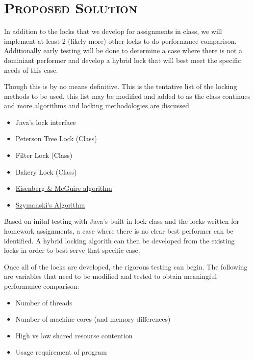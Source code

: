 \documentclass[finalProject.tex]{subfiles}
\begin{document}
\bigskip

\section*{\textsc{\Large Proposed Solution}}

In addition to the locks that we develop for assignments in class, we will implement at least 2 (likely more) other locks to do performance comparison. Additionally early testing will be done to determine a case where there is not a dominiant performer and develop a hybrid lock that will best meet the specific needs of this case.

Though this is by no means definitive. This is the tentative list of the locking methods to be used, this list may be modified and added to as the class continues and more algorithms and locking methodologies are discussed 

\smallskip

\begin{itemize}
\item Java's lock interface
\item Peterson Tree Lock (Class)
\item Filter Lock (Class)
\item Bakery Lock (Class)
\item \href{http://en.wikipedia.org/wiki/Eisenberg_%26_McGuire_algorithm}{Eisenberg \& McGuire algorithm}
\item \href{http://en.wikipedia.org/wiki/Szymanski%27s_Algorithm}{Szymanski's Algorithm}
\end{itemize}

Based on inital testing with Java's built in lock class and the locks written for homework assignments, a case where there is no clear best performer can be identified. A hybrid locking algorith can then be developed from the existing locks in order to best serve that specific case. 

Once all of the locks are developed, the rigorous testing can begin. The following are variables that need to be modified and tested to obtain meaningful performance comparison:

\begin{itemize}
\item Number of threads
\item Number of machine cores (and memory differences)
\item High vs low shared resourse contention
\item Usage requirement of program
\end{itemize}
\end{document}
